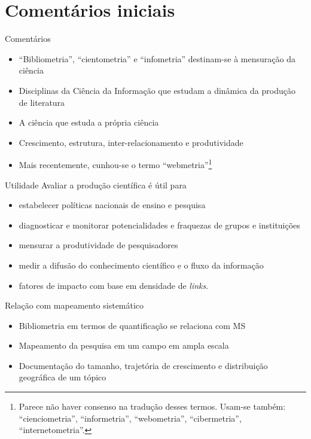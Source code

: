 
\section{Comentários iniciais}

\begin{frame}{Comentários}
\begin{itemize}
\item ``Bibliometria'', ``cientometria'' e ``infometria'' destinam-se à mensuração da ciência
\item Disciplinas da Ciência da Informação que estudam a dinâmica da produção de literatura
\item A ciência que estuda a própria ciência
\item Crescimento, estrutura, inter-relacionamento e produtividade
\item Mais recentemente, cunhou-se o termo ``webmetria''\footnote{Parece não haver consenso na tradução desses termos. Usam-se também: ``cienciometria'', ``informetria'', ``webometria'', ``cibermetria'', ``internetometria''.}
\end{itemize}
\end{frame}

\begin{frame}{Utilidade}
Avaliar a produção científica é útil para
\begin{itemize}
\item estabelecer políticas nacionais de ensino e pesquisa
\item diagnosticar e monitorar potencialidades e fraquezas de grupos e instituições
\item mensurar a produtividade de pesquisadores
\item medir a difusão do conhecimento científico e o fluxo da informação
\item fatores de impacto com base em densidade de \emph{links}.
\end{itemize}
\end{frame}

\begin{frame}{Relação com mapeamento sistemático}
\begin{itemize}
\item Bibliometria em termos de quantificação se relaciona com MS 
\item Mapeamento da pesquisa em um campo em ampla escala 
\item Documentação do tamanho, trajetória de crescimento e distribuição geográfica de um tópico
\end{itemize}
\end{frame}

